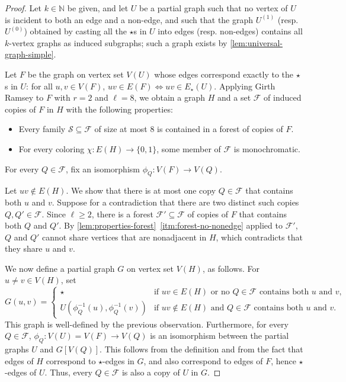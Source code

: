 \documentclass[11pt]{article}
\theoremstyle{remark}
\begin{document}
\begin{proof}
    Let $k \in \mathbb{N}$ be given, and let $U$ be a partial graph such that no vertex of $U$ is incident to both an edge and a non-edge, and such that the graph $U^{(1)}$ (resp. $U^{(0)}$) obtained by casting all the $\star$s in $U$ into edges (resp. non-edges) contains all $k$-vertex graphs as induced subgraphs; such a graph exists by \cref{lem:universal-graph-simple}.
    
    Let $F$ be the graph on vertex set $V(U)$ whose edges correspond exactly to the $\star$s in $U$: for all $u, v \in V(F)$, $uv \in E(F) \iff uv \in E_\star(U)$.
    Applying Girth Ramsey to $F$ with $r = 2$ and $\ell = 8$, we obtain a graph $H$ and a set $\mathcal{F}$ of induced copies of $F$ in $H$ with the following properties: \begin{itemize}
        \item Every family $\mathcal{S} \subseteq \mathcal{F}$ of size at most $8$ is contained in a forest of copies of $F$.
        \item For every coloring $\chi : E(H) \to \{0, 1\}$, some member of $\mathcal{F}$ is monochromatic.
    \end{itemize}
    For every $Q \in \mathcal{F}$, fix an isomorphism $\phi_Q : V(F) \to V(Q)$.
    
    Let $uv \notin E(H)$. 
    We show that there is at most one copy $Q \in \mathcal{F}$ that contains both $u$ and $v$.
    Suppose for a contradiction that there are two distinct such copies $Q, Q' \in \mathcal{F}$.
    Since $\ell \geq 2$, there is a forest $\mathcal{F}' \subseteq \mathcal{F}$ of copies of $F$ that contains both $Q$ and $Q'$.
    By \cref{lem:properties-forest}~\ref{itm:forest-no-nonedge} applied to $\mathcal{F'}$, $Q$ and $Q'$ cannot share vertices that are nonadjacent in $H$, which contradicts that they share $u$ and $v$.
    
    We now define a partial graph $G$ on vertex set $V(H)$, as follows. For $u \neq v \in V(H)$, set
    \[G(u, v) = \begin{cases}
      \star &\text{if $uv \in E(H)$ or no $Q \in \mathcal{F}$ contains both $u$ and $v$,} \\
      U(\phi_Q^{-1}(u), \phi_Q^{-1}(v)) &\text{if $uv \notin E(H)$ and $Q \in \mathcal{F}$ contains both $u$ and $v$.}
    \end{cases}\]
    This graph is well-defined by the previous observation.
    Furthermore, for every $Q \in \mathcal{F}$, $\phi_Q : V(U) = V(F) \to V(Q)$ is an isomorphism between the partial graphs $U$ and $G[V(Q)]$. This follows from the definition and from the fact that edges of $H$ correspond to $\star$-edges in $G$, and also correspond to edges of $F$, hence $\star$-edges of $U$.
    Thus, every $Q \in \mathcal{F}$ is also a copy of $U$ in $G$.
    

\end{proof}
\end{document}
